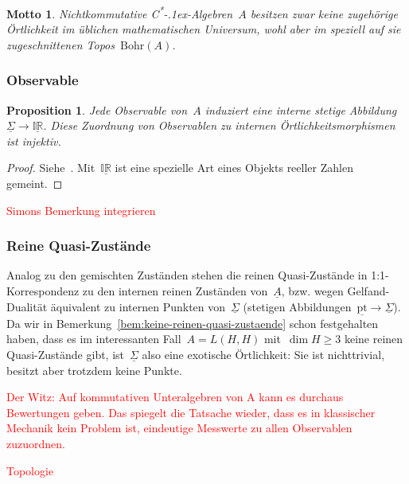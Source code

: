 \documentclass[a4paper,ngerman,12pt]{scrartcl}
\theoremstyle{definition}
\theoremstyle{plain}
\newtheorem{prop}[defn]{Proposition}
\newtheorem{motto}[defn]{Motto}
\theoremstyle{remark}
\newcommand{\CC}{\mathbb{C}}
\newcommand{\C}{\mathcal{C}}
\newcommand{\Bohr}{\mathrm{Bohr}}
\newcommand{\pt}{\mathrm{pt}}
\newcommand{\ul}[1]{\underline{#1}}
\newcommand{\csalgebren}{C\textsuperscript{*}\kern-.1ex-Alge\-bren}
\renewcommand{\_}{\mathpunct{.}\,}
\newcommand{\?}{\,{:}\,}
\newcommand{\XXX}[1]{\textcolor{red}{#1}}
\begin{document}
\begin{motto}Nichtkommutative \csalgebren~$A$ besitzen zwar keine zugehörige
Örtlichkeit im üblichen mathematischen Universum, wohl aber im speziell auf sie
zugeschnittenen Topos~$\Bohr(A)$.\end{motto}


\subsubsection*{Observable}

\begin{prop}Jede Observable von~$A$ induziert eine interne stetige
Abbildung~$\ul{\Sigma} \to \ul{\mathbb{IR}}$. Diese Zuordnung von Observablen
zu internen Örtlichkeitsmorphismen ist
injektiv.\end{prop}
\begin{proof}Siehe~\cite[Prop.~15]{topos:aqt}. Mit~$\ul{\mathbb{IR}}$ ist eine
spezielle Art eines Objekts reeller Zahlen gemeint.\end{proof}

\XXX{Simons Bemerkung integrieren}


\subsubsection*{Reine Quasi-Zustände}

Analog zu den gemischten Zuständen stehen die reinen Quasi-Zustände in
1:1-Kor\-res\-pon\-denz zu 
den internen reinen Zuständen von~$\ul{A}$, bzw. wegen Gelfand-Dualität
äquivalent zu internen Punkten von~$\ul{\Sigma}$ (stetigen
Abbildungen~$\ul{\pt} \to \ul{\Sigma}$). Da wir in
Bemerkung~\ref{bem:keine-reinen-quasi-zustaende} schon festgehalten haben, dass es im
interessanten Fall~$A = L(H,H)$ mit~$\dim H \geq 3$ keine reinen Quasi-Zustände
gibt, ist~$\ul{\Sigma}$ also eine exotische Örtlichkeit: Sie ist nichttrivial,
besitzt aber trotzdem keine Punkte.


\XXX{Der Witz: Auf kommutativen Unteralgebren von A kann es durchaus
Bewertungen geben. Das spiegelt die Tatsache wieder, dass es in
klassischer Mechanik kein Problem ist, eindeutige Messwerte zu allen
Observablen zuzuordnen.}

\XXX{Topologie}

\end{document}
